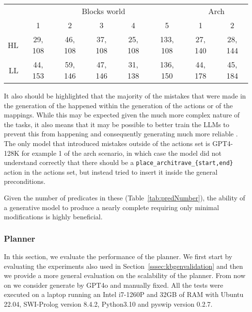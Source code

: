 \begin{table*}[htp]
    \centering
    \begin{tabular}{r|c|c|c|c|c||c|c}
                & \multicolumn{5}{c||}{Blocks world} & \multicolumn{2}{c}{Arch}\\
                &     1    &  2      &  3  &  4  &  5  &  1  &  2 \\
        \hline
         HL     & 29, 108  & 46, 108 & 37, 108 & 25, 108 & 133, 108 & 27, 140 & 28, 144 \\
         LL     & 44, 153  & 59, 146 & 47, 146 & 31, 138 & 136, 150 & 44, 178 & 45, 184
    \end{tabular}
    \caption{The number of predicates in the final \kbs using GPT4o after having fixed possible mistakes. The first value is the number of grounded predicates, either in the general \kb or in the states, while the second is the number of lifted predicates in the actions.}
    \label{tab:predNumber}
\end{table*}

It also should be highlighted that the majority of the mistakes that were made in the generation of the \kb happened within the generation of the actions or of the mappings. While this may be expected given the much more complex nature of the tasks, it also means that it may be possible to better train the LLMs to prevent this from happening and consequently generating much more reliable \kbs. The only model that introduced mistakes outside of the actions set is GPT4-128K for example 1 of the arch scenario, in which case the model did not understand correctly that there should be a \verb|place_architrave_{start,end}| action in the actions set, but instead tried to insert it inside the general preconditions.

Given the number of predicates in these \kbs (Table~\ref{tab:predNumber}), the ability of a generative model to produce a nearly complete \kb requiring only minimal modifications is highly beneficial.

\subsubsection{Planner}
\label{sssec:planRes}

In this section, we evaluate the performance of the planner. We first start by evaluating the experiments also used in Section~\ref{sssec:kbgenvalidation} and then we provide a more general evaluation on the scalability of the planner. From now on we consider \kbs generate by GPT4o and manually fixed. All the tests were executed on a laptop running an Intel i7-1260P and 32GB of RAM with Ubuntu 22.04, SWI-Prolog version 8.4.2, Python3.10 and pyswip version 0.2.7. 

